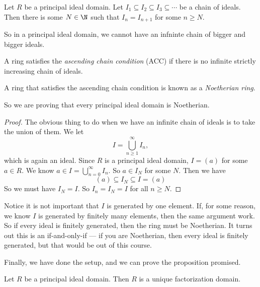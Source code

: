 \documentclass[a4paper]{article}
\begin{document}
\begin{lemma}
  Let $R$ be a principal ideal domain. Let $I_1 \subseteq I_2 \subseteq I_3 \subseteq \cdots$ be a chain of ideals. Then there is some $N\in \N$ such that $I_n = I_{n + 1}$ for some $n \geq N$.
\end{lemma}
So in a principal ideal domain, we cannot have an infninte chain of bigger and bigger ideals.

\begin{defi}
  A ring satisfies the \emph{ascending chain condition} (ACC) if there is no infinite strictly increasing chain of ideals.
\end{defi}

\begin{defi}
  A ring that satisfies the ascending chain condition is known as a \emph{Noetherian ring}.
\end{defi}

So we are proving that every principal ideal domain is Noetherian.

\begin{proof}
  The obvious thing to do when we have an infinite chain of ideals is to take the union of them. We let
  \[
    I = \bigcup_{n \geq 1}^\infty I_n,
  \]
  which is again an ideal. Since $R$ is a principal ideal domain, $I = (a)$ for some $a \in R$. We know $a \in I = \bigcup_{n = 0}^\infty I_n$. So $a \in I_N$ for some $N$. Then we have
  \[
    (a) \subseteq I_N \subseteq I = (a)
  \]
  So we must have $I_N = I$. So $I_n = I_N = I$ for all $n \geq N$.
\end{proof}
Notice it is not important that $I$ is generated by one element. If, for some reason, we know $I$ is generated by finitely many elements, then the same argument work. So if every ideal is finitely generated, then the ring must be Noetherian. It turns out this is an if-and-only-if --- if you are Noetherian, then every ideal is finitely generated, but that would be out of this course.

Finally, we have done the setup, and we can prove the proposition promised.
\begin{prop}
  Let $R$ be a principal ideal domain. Then $R$ is a unique factorization domain.
\end{prop}
\end{document}
